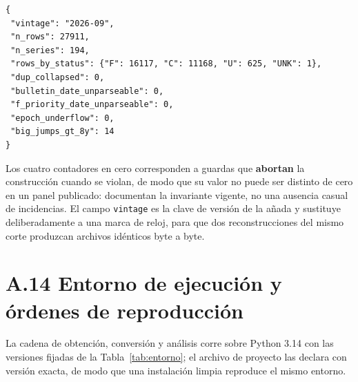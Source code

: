 \documentclass[12pt,letterpaper]{report}
\begin{document}
\begin{verbatim}
{
 "vintage": "2026-09",
 "n_rows": 27911,
 "n_series": 194,
 "rows_by_status": {"F": 16117, "C": 11168, "U": 625, "UNK": 1},
 "dup_collapsed": 0,
 "bulletin_date_unparseable": 0,
 "f_priority_date_unparseable": 0,
 "epoch_underflow": 0,
 "big_jumps_gt_8y": 14
}
\end{verbatim}

Los cuatro contadores en cero corresponden a guardas que \textbf{abortan} la construcción
cuando se violan, de modo que su valor no puede ser distinto de cero en un panel publicado:
documentan la invariante vigente, no una ausencia casual de incidencias. El campo
\texttt{vintage} es la clave de versión de la añada y sustituye deliberadamente a una marca
de reloj, para que dos reconstrucciones del mismo corte produzcan archivos idénticos byte a
byte.

\section{A.14 Entorno de ejecución y órdenes de reproducción}

La cadena de obtención, conversión y análisis corre sobre Python 3.14 con las versiones
fijadas de la Tabla~\ref{tab:entorno}; el archivo de proyecto las declara con versión exacta,
de modo que una instalación limpia reproduce el mismo entorno.
\end{document}

